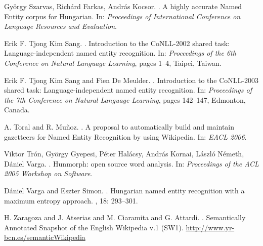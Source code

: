 \documentclass[11pt]{article}
\begin{document}
\begin{thebibliography}{}
György Szarvas, Richárd Farkas, András Kocsor.
.
\newblock A highly accurate Named Entity corpus for Hungarian. 
\newblock In: {\em Proceedings of International Conference on Language Resources and Evaluation}.

Erik F. Tjong Kim Sang.
.
\newblock Introduction to the CoNLL-2002 shared task: Language-independent named entity recognition.
\newblock In: {\em Proceedings of the 6th Conference on Natural Language Learning}, pages 1--4, Taipei, Taiwan.

Erik F. Tjong Kim Sang and Fien De Meulder.
.
\newblock Introduction to the CoNLL-2003 shared task: Language-independent named entity recognition. 
\newblock In: {\em Proceedings of the 7th Conference on Natural Language Learning}, pages 142--147, Edmonton, Canada.

A. Toral and R. Mu\~noz.
.
\newblock A proposal to automatically build and maintain gazetteers for Named Entity Recognition by using Wikipedia.
\newblock In: {\em EACL 2006}.

Viktor Trón, György Gyepesi, Péter Halácsy, András Kornai, László Németh, Dániel Varga.
.
\newblock Hunmorph: open source word analysis.
\newblock In: {\em Proceedings of the ACL 2005 Workshop on Software}. 

Dániel Varga and Eszter Simon.
.
\newblock Hungarian named entity recognition with a maximum entropy approach.
, 18: 293--301.

H. Zaragoza and J. Atserias and M. Ciaramita and G. Attardi.
.
\newblock Semantically Annotated Snapshot of the English Wikipedia v.1 (SW1).
\newblock \url{http://www.yr-bcn.es/semanticWikipedia}


\end{thebibliography}
\end{document}
